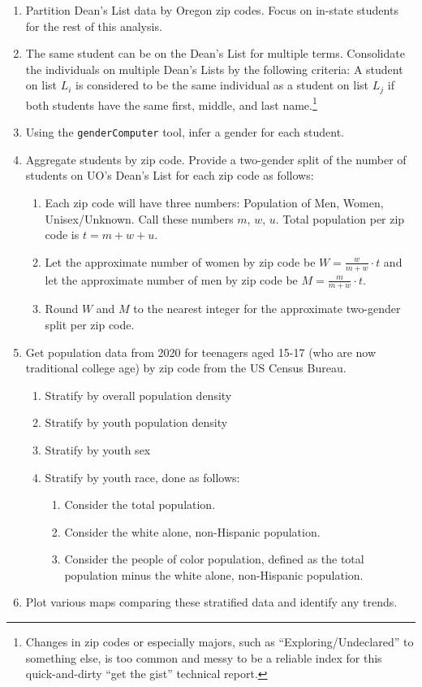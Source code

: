 \documentclass[10pt]{article}
\begin{document}
\begin{enumerate}
	\item Partition Dean's List data by Oregon zip codes. Focus on in-state students for the rest of this analysis.
	\item The same student can be on the Dean's List for multiple terms. Consolidate the individuals on multiple Dean's Lists by the following criteria:
	A student on list $L_i$ is considered to be the same individual as a student on list $L_j$ if both students have the same first, middle, and last name.\footnote{Changes in zip codes or especially majors, such as ``Exploring/Undeclared'' to something else, is too common and messy to be a reliable index for this quick-and-dirty ``get the gist'' technical report.}
	\item Using the \texttt{genderComputer} tool, infer a gender for each student.
	\item Aggregate students by zip code. Provide a two-gender split of the number of students on UO's Dean's List for each zip code as follows:
	\begin{enumerate}
		\item Each zip code will have three numbers: Population of Men, Women, Unisex/Unknown. Call these numbers $m$, $w$, $u$. Total population per zip code is $t=m+w+u$.
		\item Let the approximate number of women by zip code be $W=\frac{w}{m+w} \cdot t$ and let the approximate number of men by zip code be $M=\frac{m}{m+w} \cdot t$.
		\item Round $W$ and $M$ to the nearest integer for the approximate two-gender split per zip code.
	\end{enumerate}
	\item Get population data from 2020 for teenagers aged 15-17 (who are now traditional college age) by zip code from the US Census Bureau.
	\begin{enumerate}
		\item Stratify by overall population density
		\item Stratify by youth population density
		\item Stratify by youth sex
		\item Stratify by youth race, done as follows:
		\begin{enumerate}
			\item Consider the total population.
			\item Consider the white alone, non-Hispanic population.
			\item Consider the people of color population, defined as the total population minus the white alone, non-Hispanic population.
		\end{enumerate}
	\end{enumerate}
	\item Plot various maps comparing these stratified data and identify any trends. 
\end{enumerate}
\end{document}
